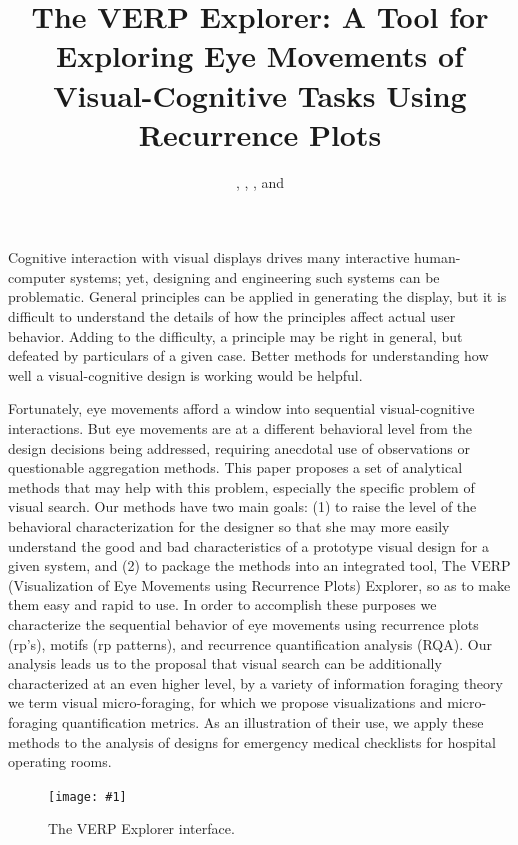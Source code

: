 \documentclass[journal]{vgtc}                %
\title{The VERP Explorer: A Tool for Exploring Eye Movements of
Visual-Cognitive Tasks Using Recurrence Plots}
\author{\cagatay, \jesse, \jeff, and \stu}
\newcommand{\insertpicture}[2]{\begin{center}\texttt{[image: \#1]}\end{center}}
\begin{document}


\maketitle

Cognitive interaction with visual displays drives many interactive
human-computer systems; yet, designing and engineering such systems can be
problematic. General principles can be applied in generating the display, but
it is difficult to  understand the details of how the principles affect actual
user behavior. Adding to the difficulty, a principle may be right in general,
but defeated by particulars of a given case. Better methods for understanding
how well a visual-cognitive design is working would be helpful. 

Fortunately, eye movements afford a window into sequential visual-cognitive
interactions. But eye movements are at a different behavioral level from
the design decisions being addressed, requiring anecdotal use of
observations or questionable aggregation methods. This paper proposes a set
of analytical methods that may help with this problem, especially the
specific problem of visual search. Our methods have two main goals: (1) to
raise the level of the behavioral characterization for the designer so that
she may more easily understand the good and bad characteristics of a
prototype visual design for a given system, and (2) to package the methods
into an integrated tool, The VERP (Visualization of Eye Movements using
Recurrence Plots) Explorer, so as to make them easy and rapid to use. In
order to accomplish these purposes we characterize the sequential behavior of
eye movements using recurrence plots (rp's), 
motifs (rp patterns), and recurrence quantification analysis (RQA). Our analysis leads us to
the proposal that visual search can be additionally characterized at an even
higher level, by a variety of information foraging theory we term visual
micro-foraging, for which we propose visualizations and micro-foraging
quantification metrics. As an illustration of their use, we apply these
methods to the analysis of designs for emergency medical checklists for
hospital operating rooms.
\begin{figure}
	\insertpicture{figures/interface2.pdf}{0.5}
 	\caption{The VERP Explorer interface.
    \label{fig:interface}}
\end{figure}
\end{document}
